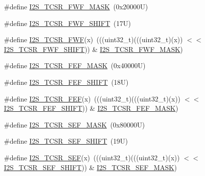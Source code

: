 \begin{DoxyCompactItemize}
\item 
\#define \mbox{\hyperlink{group___i2_s___register___masks_gabcaea4a4f528b0d25ff0f0b72d4a4c93}{I2\+S\+\_\+\+T\+C\+S\+R\+\_\+\+F\+W\+F\+\_\+\+M\+A\+SK}}~(0x20000\+U)
\item 
\#define \mbox{\hyperlink{group___i2_s___register___masks_ga7cb29b185e9330124f8777c090685d49}{I2\+S\+\_\+\+T\+C\+S\+R\+\_\+\+F\+W\+F\+\_\+\+S\+H\+I\+FT}}~(17\+U)
\item 
\#define \mbox{\hyperlink{group___i2_s___register___masks_gac51266d9349bd0ebfe25f095384d307e}{I2\+S\+\_\+\+T\+C\+S\+R\+\_\+\+F\+WF}}(x)~(((uint32\+\_\+t)(((uint32\+\_\+t)(x)) $<$$<$ \mbox{\hyperlink{group___i2_s___register___masks_ga7cb29b185e9330124f8777c090685d49}{I2\+S\+\_\+\+T\+C\+S\+R\+\_\+\+F\+W\+F\+\_\+\+S\+H\+I\+FT}})) \& \mbox{\hyperlink{group___i2_s___register___masks_gabcaea4a4f528b0d25ff0f0b72d4a4c93}{I2\+S\+\_\+\+T\+C\+S\+R\+\_\+\+F\+W\+F\+\_\+\+M\+A\+SK}})
\item 
\#define \mbox{\hyperlink{group___i2_s___register___masks_ga545f4444c3ca226a3318c67b76061406}{I2\+S\+\_\+\+T\+C\+S\+R\+\_\+\+F\+E\+F\+\_\+\+M\+A\+SK}}~(0x40000\+U)
\item 
\#define \mbox{\hyperlink{group___i2_s___register___masks_ga00880fa506ae5f85e2cf22d7251cc217}{I2\+S\+\_\+\+T\+C\+S\+R\+\_\+\+F\+E\+F\+\_\+\+S\+H\+I\+FT}}~(18\+U)
\item 
\#define \mbox{\hyperlink{group___i2_s___register___masks_ga2cfa2263a509ac6cd3eb923eebd7b99e}{I2\+S\+\_\+\+T\+C\+S\+R\+\_\+\+F\+EF}}(x)~(((uint32\+\_\+t)(((uint32\+\_\+t)(x)) $<$$<$ \mbox{\hyperlink{group___i2_s___register___masks_ga00880fa506ae5f85e2cf22d7251cc217}{I2\+S\+\_\+\+T\+C\+S\+R\+\_\+\+F\+E\+F\+\_\+\+S\+H\+I\+FT}})) \& \mbox{\hyperlink{group___i2_s___register___masks_ga545f4444c3ca226a3318c67b76061406}{I2\+S\+\_\+\+T\+C\+S\+R\+\_\+\+F\+E\+F\+\_\+\+M\+A\+SK}})
\item 
\#define \mbox{\hyperlink{group___i2_s___register___masks_gaafdb1a4476b3a25a9f1af0475beb81d6}{I2\+S\+\_\+\+T\+C\+S\+R\+\_\+\+S\+E\+F\+\_\+\+M\+A\+SK}}~(0x80000\+U)
\item 
\#define \mbox{\hyperlink{group___i2_s___register___masks_gab079539e78cc6efb8d477dfe1f349f00}{I2\+S\+\_\+\+T\+C\+S\+R\+\_\+\+S\+E\+F\+\_\+\+S\+H\+I\+FT}}~(19\+U)
\item 
\#define \mbox{\hyperlink{group___i2_s___register___masks_ga507cded79868dc38e0b3d3a209142a5c}{I2\+S\+\_\+\+T\+C\+S\+R\+\_\+\+S\+EF}}(x)~(((uint32\+\_\+t)(((uint32\+\_\+t)(x)) $<$$<$ \mbox{\hyperlink{group___i2_s___register___masks_gab079539e78cc6efb8d477dfe1f349f00}{I2\+S\+\_\+\+T\+C\+S\+R\+\_\+\+S\+E\+F\+\_\+\+S\+H\+I\+FT}})) \& \mbox{\hyperlink{group___i2_s___register___masks_gaafdb1a4476b3a25a9f1af0475beb81d6}{I2\+S\+\_\+\+T\+C\+S\+R\+\_\+\+S\+E\+F\+\_\+\+M\+A\+SK}})
$$
\end{DoxyCompactItemize}
